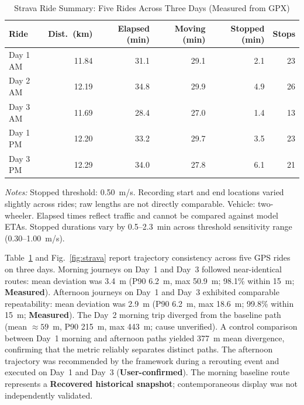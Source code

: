 \documentclass[11pt,conference]{IEEEtran}
\begin{document}
\begin{table}[t]
\caption{Strava Ride Summary: Five Rides Across Three Days (Measured from GPX)}
\label{tab:strava}
\centering
\footnotesize
\setlength{\tabcolsep}{2pt}
\renewcommand{\arraystretch}{1.05}
\begin{tabular}{@{}lrrrrr@{}}
\hline
\textbf{Ride} & \textbf{Dist.\ (km)} & \textbf{Elapsed (min)} & \textbf{Moving (min)} & \textbf{Stopped (min)} & \textbf{Stops} \\
\hline
Day 1 AM & 11.84 & 31.1 & 29.1 & 2.1 & 23 \\
Day 2 AM & 12.19 & 34.8 & 29.9 & 4.9 & 26 \\
Day 3 AM & 11.69 & 28.4 & 27.0 & 1.4 & 13 \\
Day 1 PM & 12.20 & 33.2 & 29.7 & 3.5 & 23 \\
Day 3 PM & 12.29 & 34.0 & 27.8 & 6.1 & 21 \\
\hline
\end{tabular}
\vspace{1.5pt}
\begin{minipage}{\columnwidth}
\scriptsize
\textit{Notes:} Stopped threshold: 0.50~m/s. Recording start and end locations varied slightly across rides; raw lengths are not directly comparable. Vehicle: two-wheeler. Elapsed times reflect traffic and cannot be compared against model ETAs. Stopped durations vary by 0.5--2.3~min across threshold sensitivity range (0.30--1.00~m/s).
\end{minipage}
\end{table}

Table~\ref{tab:strava} and Fig.~\ref{fig:strava} report trajectory consistency across five GPS rides on three days.
Morning journeys on Day~1 and Day~3 followed near-identical routes: mean deviation was 3.4~m (P90 6.2~m, max 50.9~m; 98.1\% within 15~m; \textbf{Measured}).
Afternoon journeys on Day~1 and Day~3 exhibited comparable repeatability: mean deviation was 2.9~m (P90 6.2~m, max 18.6~m; 99.8\% within 15~m; \textbf{Measured}).
The Day~2 morning trip diverged from the baseline path (mean $\approx 59$~m, P90 215~m, max 443~m; cause unverified).
A control comparison between Day~1 morning and afternoon paths yielded 377~m mean divergence, confirming that the metric reliably separates distinct paths.
The afternoon trajectory was recommended by the framework during a rerouting event and executed on Day~1 and Day~3 (\textbf{User-confirmed}).
The morning baseline route represents a \textbf{Recovered historical snapshot}; contemporaneous display was not independently validated.
\end{document}
